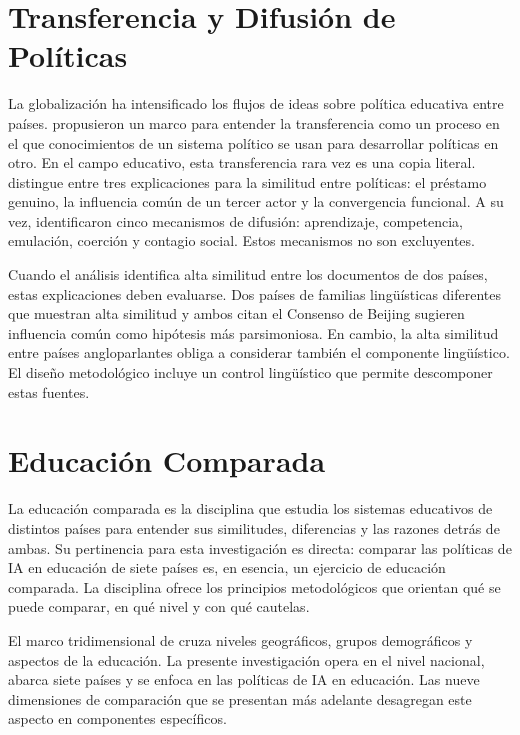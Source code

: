 \section{Transferencia y Difusión de Políticas}

La globalización ha intensificado los flujos de ideas sobre política educativa entre países. \citet{dolowitz2000learning} propusieron un marco para entender la transferencia como un proceso en el que conocimientos de un sistema político se usan para desarrollar políticas en otro. En el campo educativo, esta transferencia rara vez es una copia literal. \citet{steinerkhamsi2014cross} distingue entre tres explicaciones para la similitud entre políticas: el préstamo genuino, la influencia común de un tercer actor y la convergencia funcional. A su vez, \citet{shipan2012diffusion} identificaron cinco mecanismos de difusión: aprendizaje, competencia, emulación, coerción y contagio social. Estos mecanismos no son excluyentes.

Cuando el análisis identifica alta similitud entre los documentos de dos países, estas explicaciones deben evaluarse. Dos países de familias lingüísticas diferentes que muestran alta similitud y ambos citan el Consenso de Beijing sugieren influencia común como hipótesis más parsimoniosa. En cambio, la alta similitud entre países angloparlantes obliga a considerar también el componente lingüístico. El diseño metodológico incluye un control lingüístico que permite descomponer estas fuentes.


\section{Educación Comparada}

La educación comparada es la disciplina que estudia los sistemas educativos de distintos países para entender sus similitudes, diferencias y las razones detrás de ambas. Su pertinencia para esta investigación es directa: comparar las políticas de IA en educación de siete países es, en esencia, un ejercicio de educación comparada. La disciplina ofrece los principios metodológicos que orientan qué se puede comparar, en qué nivel y con qué cautelas.

El marco tridimensional de \citet{bray1995levels} cruza niveles geográficos, grupos demográficos y aspectos de la educación. La presente investigación opera en el nivel nacional, abarca siete países y se enfoca en las políticas de IA en educación. Las nueve dimensiones de comparación que se presentan más adelante desagregan este aspecto en componentes específicos.

